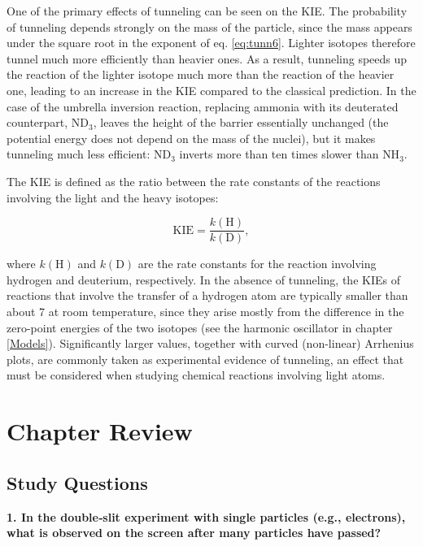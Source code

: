 \documentclass[
  english,
  9pt,
]{extbook}
\theoremstyle{definition}
\theoremstyle{definition}
\theoremstyle{definition}
\theoremstyle{definition}
\theoremstyle{remark}
\begin{document}
One of the primary effects of tunneling can be seen on the KIE. The probability of tunneling depends strongly on the mass of the particle, since the mass appears under the square root in the exponent of eq. \eqref{eq:tunn6}. Lighter isotopes therefore tunnel much more efficiently than heavier ones. As a result, tunneling speeds up the reaction of the lighter isotope much more than the reaction of the heavier one, leading to an increase in the KIE compared to the classical prediction. In the case of the umbrella inversion reaction, replacing ammonia with its deuterated counterpart, \(\text{ND}_3\), leaves the height of the barrier essentially unchanged (the potential energy does not depend on the mass of the nuclei), but it makes tunneling much less efficient: \(\text{ND}_3\) inverts more than ten times slower than \(\text{NH}_3\).

The KIE is defined as the ratio between the rate constants of the reactions involving the light and the heavy isotopes:

\begin{equation}
\text{KIE} = \frac{k(\text{H})}{k(\text{D})},
\label{eq:kie}  
\end{equation}

where \(k(\text{H})\) and \(k(\text{D})\) are the rate constants for the reaction involving hydrogen and deuterium, respectively. In the absence of tunneling, the KIEs of reactions that involve the transfer of a hydrogen atom are typically smaller than about 7 at room temperature, since they arise mostly from the difference in the zero-point energies of the two isotopes (see the harmonic oscillator in chapter \ref{Models}). Significantly larger values, together with curved (non-linear) Arrhenius plots, are commonly taken as experimental evidence of tunneling, an effect that must be considered when studying chemical reactions involving light atoms.

\section{Chapter Review}\label{rev8}

\subsection{Study Questions}\label{quest8}

\textbf{1. In the double‑slit experiment with single particles (e.g., electrons), what is observed on the screen after many particles have passed?}
\end{document}
